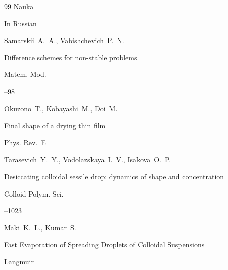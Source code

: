 \begin{thebibliography}{99}
\publ Nauka








\lang In Russian

\by Samarskii~A.~A., Vabishchevich~P.~N.

\paper Difference schemes for non-stable problems

\jour Matem. Mod.




--98






\by Okuzono~T., Kobayashi~M., Doi~M.

\paper  Final shape of a drying thin film

\jour Phys. Rev.~E









\by Tarasevich~Y.~Y., Vodolazskaya~I.~V., Isakova~O.~P. 

\paper Desiccating colloidal sessile drop: dynamics of shape and concentration

\jour Colloid Polym. Sci.




--1023





\by Maki~K.~L., Kumar~S.

\paper  Fast Evaporation of Spreading Droplets of Colloidal Suspensions

\jour Langmuir




\end{thebibliography}
